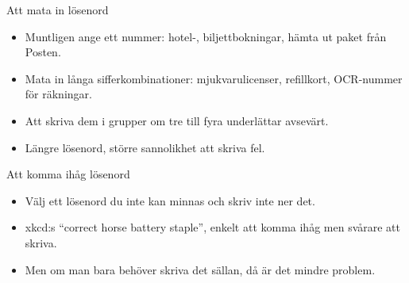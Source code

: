 \documentclass{beamer}
\begin{document}
\begin{frame}{\insertsubsectionhead}{Att mata in lösenord}
  \begin{itemize}
    \item Muntligen ange ett nummer: hotel-, biljettbokningar, hämta ut paket 
      från Posten.

    \item Mata in långa sifferkombinationer: mjukvarulicenser, refillkort, 
      OCR-nummer för räkningar.

    \item Att skriva dem i grupper om tre till fyra underlättar avsevärt.

    \item Längre lösenord, större sannolikhet att skriva fel.

  \end{itemize}
\end{frame}

\begin{frame}{\insertsubsectionhead}{Att komma ihåg lösenord}
  \begin{itemize}
    \item Välj ett lösenord du inte kan minnas och skriv inte ner det.

    \item xkcd:s \enquote{correct horse battery staple}, enkelt att komma ihåg 
      men svårare att skriva.

    \item Men om man bara behöver skriva det sällan, då är det mindre problem.

  \end{itemize}
\end{frame}
\end{document}
